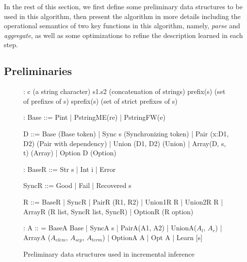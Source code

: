 In the rest of this section, we first define some preliminary data structures 
to be used in this algorithm, then present
the algorithm in more details including the operational semantics
of two key functions in this algorithm, namely, 
{\em parse} and {\em aggregate}, as well as some optimizations to refine
the description learned in each step.


\subsection{Preliminaries}

\begin{figure}[t]
{\small 
\begin{code}
:
c          (a string character)	
s1.s2      (concatenation of strings)
prefix(s)  (set of prefixes of s)
sprefix(s) (set of strict prefixes of s)

\cdmath
{}:
Base ::= Pint | PstringME(re) | PstringFW(e)

D ::=   
  Base               (Base token)
| Sync s             (Synchronizing token) 
| Pair (x:D1, D2)    (Pair with dependency)
| Union (D1, D2)     (Union)
| Array(D, s, t)     (Array)
| Option D           (Option)

:
BaseR ::= Str s | Int i | Error

SyncR ::= Good | Fail | Recovered s 

R ::=
  BaseR
| SyncR
| PairR (R1, R2)
| Union1R R | Union2R R 
| ArrayR (R list, SyncR list, SyncR)
| OptionR (R option)

:
A :: = 
  BaseA Base
| SyncA s
| PairA(A1, A2)
| UnionA($A_l$, $A_r$)
| ArrayA ($A_{elem}$, $A_{sep}$, $A_{term}$)
| OptionA A
| Opt A
| Learn [s]
\end{code}
}
\caption{Preliminary data structures used in incremental inference}
\label{fig:data-structures}
\end{figure}

